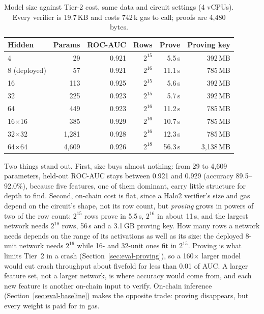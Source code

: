 \documentclass[sigconf,nonacm]{acmart}
\begin{document}
\begin{table}[t]
  \caption{Model size against Tier-2 cost, same data and circuit settings (4 vCPUs). Every verifier is 19.7\,KB and costs 742\,k gas to call; proofs are 4,480 bytes.}
  \label{tab:modelsize}
  \footnotesize
  \setlength{\tabcolsep}{3pt}
  \begin{tabular}{@{}lrrrrr@{}}
    \toprule
    \textbf{Hidden} & \textbf{Params} & \textbf{ROC-AUC} & \textbf{Rows} & \textbf{Prove} & \textbf{Proving key} \\
    \midrule
    4 & 29 & 0.921 & $2^{15}$ & 5.5\,s & 392\,MB \\
    8 (deployed) & 57 & 0.921 & $2^{16}$ & 11.1\,s & 785\,MB \\
    16 & 113 & 0.925 & $2^{15}$ & 5.6\,s & 392\,MB \\
    32 & 225 & 0.923 & $2^{15}$ & 5.7\,s & 392\,MB \\
    64 & 449 & 0.923 & $2^{16}$ & 11.2\,s & 785\,MB \\
    16$\times$16 & 385 & 0.929 & $2^{16}$ & 10.7\,s & 785\,MB \\
    32$\times$32 & 1,281 & 0.928 & $2^{16}$ & 12.3\,s & 785\,MB \\
    64$\times$64 & 4,609 & 0.926 & $2^{18}$ & 56.3\,s & 3,138\,MB \\
    \bottomrule
  \end{tabular}
\end{table}

Two things stand out. First, size buys almost nothing: from 29 to 4,609 parameters, held-out ROC-AUC stays between 0.921 and 0.929 (accuracy 89.5--92.0\%), because five features, one of them dominant, carry little structure for depth to find. Second, on-chain cost is flat, since a Halo2 verifier's size and gas depend on the circuit's shape, not its row count, but \emph{proving} grows in powers of two of the row count: $2^{15}$ rows prove in 5.5\,s, $2^{16}$ in about 11\,s, and the largest network needs $2^{18}$ rows, 56\,s and a 3.1\,GB proving key. How many rows a network needs depends on the range of its activations as well as its size: the deployed 8-unit network needs $2^{16}$ while 16- and 32-unit ones fit in $2^{15}$. Proving is what limits Tier~2 in a crash (Section~\ref{sec:eval-proving}), so a 160$\times$ larger model would cut crash throughput about fivefold for less than 0.01 of AUC. A larger feature set, not a larger network, is where accuracy would come from, and each new feature is another on-chain input to verify. On-chain inference (Section~\ref{sec:eval-baseline}) makes the opposite trade: proving disappears, but every weight is paid for in gas.
\end{document}

